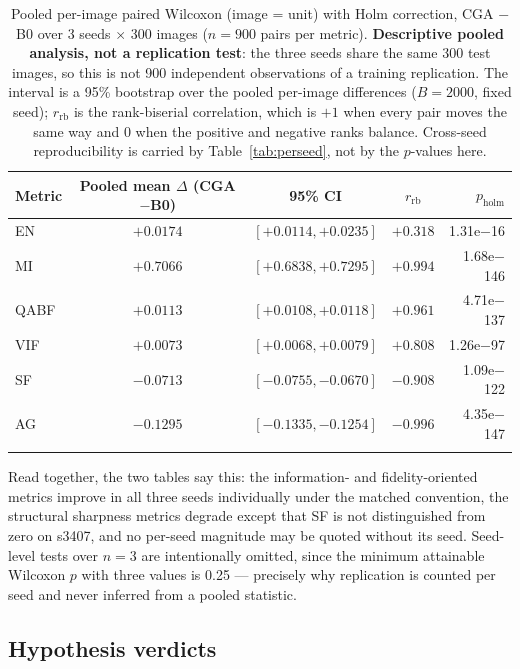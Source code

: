 \documentclass[pdflatex,sn-mathphys-num]{sn-jnl}
\theoremstyle{thmstyleone}%
\theoremstyle{thmstyletwo}%
\theoremstyle{thmstylethree}%
\begin{document}
\begin{table}[t]
\caption{Pooled per-image paired Wilcoxon (image = unit) with Holm correction, CGA $-$ B0 over 3 seeds $\times$ 300 images ($n = 900$ pairs per metric). \textbf{Descriptive pooled analysis, not a replication test}: the three seeds share the same 300 test images, so this is not 900 independent observations of a training replication. The interval is a 95\% bootstrap over the pooled per-image differences ($B = 2000$, fixed seed); $r_{\mathrm{rb}}$ is the rank-biserial correlation, which is $+1$ when every pair moves the same way and $0$ when the positive and negative ranks balance. Cross-seed reproducibility is carried by Table~\ref{tab:perseed}, not by the $p$-values here.}
\label{tab:seeds}%
\small
\begin{tabular}{@{}lcccr@{}}
\toprule
Metric & Pooled mean $\Delta$ (CGA$-$B0) & 95\% CI & $r_{\mathrm{rb}}$ & $p_{\mathrm{holm}}$ \\
\midrule
EN & $+0.0174$ & $[+0.0114, +0.0235]$ & $+0.318$ & 1.31e$-$16 \\
MI & $+0.7066$ & $[+0.6838, +0.7295]$ & $+0.994$ & 1.68e$-$146 \\
QABF & $+0.0113$ & $[+0.0108, +0.0118]$ & $+0.961$ & 4.71e$-$137 \\
VIF & $+0.0073$ & $[+0.0068, +0.0079]$ & $+0.808$ & 1.26e$-$97 \\
SF & $-0.0713$ & $[-0.0755, -0.0670]$ & $-0.908$ & 1.09e$-$122 \\
AG & $-0.1295$ & $[-0.1335, -0.1254]$ & $-0.996$ & 4.35e$-$147 \\
\botrule
\end{tabular}
\end{table}

Read together, the two tables say this: the information- and fidelity-oriented metrics improve in all three seeds individually under the matched convention, the structural sharpness metrics degrade except that SF is not distinguished from zero on s3407, and no per-seed magnitude may be quoted without its seed. Seed-level tests over $n = 3$ are intentionally omitted, since the minimum attainable Wilcoxon $p$ with three values is 0.25 --- precisely why replication is counted per seed and never inferred from a pooled statistic.

\subsection{Hypothesis verdicts}\label{sec:exp:verdicts}
\end{document}
